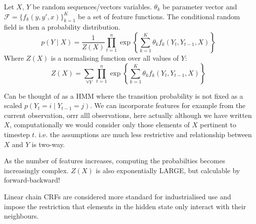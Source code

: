 \documentclass[../main.tex]{subfiles}
\begin{document}


\begin{definition}
    Let $X$, $Y$ be random sequences/vectors variables.
    $\theta_k$ be parameter vector and $\mathcal{F} = \{ f_k (y,y',x) \}_{k=1}^K$ be a set of feature functions.
    The conditional random field is then a probability distribution.
    \begin{equation*}
        p(Y \mid X) = \frac{1}{Z(X)} \prod_{t=1}^{n} \exp \left\{ \sum_{k=1}^K \theta_k f_k (Y_t, Y_{t-1}, X) \right\}
    \end{equation*}
    Where $Z(X)$ is a normalising function over all values of $Y$:
    \begin{equation*}
        Z(X) = \sum_{\forall Y} \prod_{t=1}^{n} \exp \left\{ \sum_{k=1}^K \theta_k f_k (Y_t, Y_{t-1}, X) \right\}
    \end{equation*}
\end{definition}

Can be thought of as a HMM where the transition probability is not fixed as a scaled $p (Y_t = i \mid Y_{t-1} = j)$. We can incorporate features for example from the current observation, orrr alll observations, here actually although we have written $X$, computationally we would consider only those elements of $X$ pertinent to timestep $t$.
i.e. the assumptions are much less restrictive and relationship between $X$ and $Y$ is two-way.

As the number of features increases, computing the probabilties becomes increasingly complex.
$Z(X)$ is also exponentially LARGE, but calculable by forward-backward!

Linear chain CRFs are considered more standard for industrialised use and impose the restriction that elements in the hidden state only interact with their neighbours.





\end{document}

